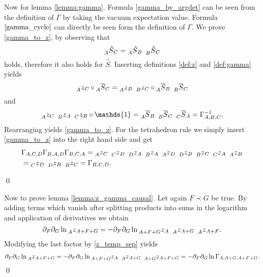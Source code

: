 \documentclass[oneside,reqno,12pt]{amsart}
\begin{document}
Now for lemma \ref{lemma:gamma}. Formula \eqref{gamma_by_argdet} can be seen from the definition of \(\Gamma\) by taking the vacuum expectation value. Formula \(\eqref{gamma_cycle}\) can directly be seen form the definition of \(\Gamma\). We prove \eqref{gamma_to_z}, by observing that
\begin{equation}
\prescript{}{A}{\tilde{S}}_{C}= \prescript{}{A}{\tilde{S}}_{B} ~\prescript{}{B}{\tilde{S}}_{C}
\end{equation}
holds, therefore it also holds for \(\hat{S}\). Inserting definitions \eqref{def:z} and \eqref{def:gamma} yields
\begin{equation}
\prescript{}{A}{z}_{C} \circ \prescript{}{A}{\overline{S}}_{C}= 
\prescript{}{A}{z}_{B}~ \prescript{}{B}{z}_{C} \circ \prescript{}{A}{\overline{S}}_{B}~\prescript{}{B}{\overline{S}}_{C}
\end{equation}
and
\begin{equation}
\prescript{}{A}{z}_{C} ~\prescript{}{B}{z}_{A}~\prescript{}{C}{z}_{B} \circ \mathds{1}= \prescript{}{A}{\overline{S}}_B ~ \prescript{}{B}{\overline{S}}_C ~\prescript{}{C}{\overline{S}}_A
=\Gamma^{-1}_{A,B,C}. 
\end{equation}
Rearranging yields \eqref{gamma_to_z}. For the tetrahedron rule we simply insert \eqref{gamma_to_z} into the right hand side and get
\begin{align*}
&\Gamma_{A,C,D} \Gamma_{B,A,D} \Gamma_{B,C,A}
= \prescript{}{A}{z}_{C} ~\prescript{}{C}{z}_{D}~\prescript{}{D}{z}_{A} ~
\prescript{}{B}{z}_{A} ~\prescript{}{A}{z}_{D}~\prescript{}{D}{z}_{B}~
\prescript{}{B}{z}_{C} ~\prescript{}{C}{z}_{A}~\prescript{}{A}{z}_{B}\\
&= \prescript{}{C}{z}_{D}~
\prescript{}{D}{z}_{B}~
\prescript{}{B}{z}_{C} =\Gamma_{B,C,D}.
\end{align*}

\qed

Now to prove lemma \ref{lemma:z_gamma_causal}. Let again \(F\prec G\) be true. By adding terms which vanish after splitting products into sums in the logarithm and application of derivatives we obtain
\begin{equation*}
\partial_F \partial_G \ln \prescript{}{A}{z}_{A+F+G} = - \partial_F \partial_G \ln \prescript{}{A+F+G}{z}_A ~\prescript{}{A}{z}_{A+G} ~\prescript{}{A}{z}_{A+F}.
\end{equation*}
Modifying the last factor by \eqref{z_temp_sep} yields
\begin{align*}
\partial_F \partial_G \ln \prescript{}{A}{z}_{A+F+G} = -\partial_F \partial_G \ln \prescript{}{A+F+G}{z}_A ~\prescript{}{A}{z}_{A+G} ~ \prescript{}{A+G}{z}_{A+F+G} = - \partial_F \partial_G \ln \Gamma_{A,A+G,A+F+G}.
\end{align*}
\qed
\end{document}
